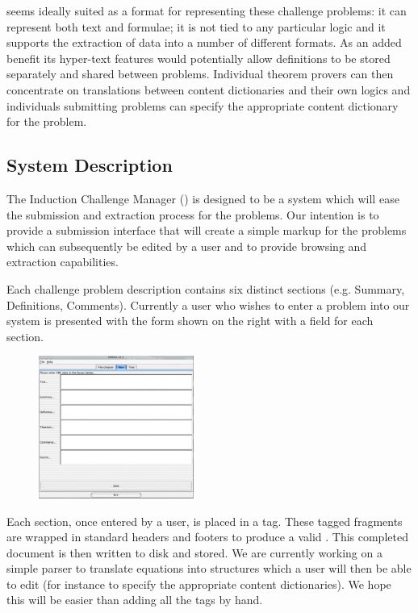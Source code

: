 {\omdoc} seems ideally suited as a format for representing these challenge
problems: it can represent both text and formulae; it
is not tied to any particular logic and it supports the extraction of data into a number
of different formats.  As an added benefit its hyper-text features would potentially allow
definitions to be stored separately and shared between problems.  Individual theorem
provers can then concentrate on translations between
{\openmath} content dictionaries and their own
logics and individuals submitting problems can specify the appropriate content dictionary
for the problem.

\subsection{System Description}
The Induction Challenge {\omdoc} Manager () is designed to be a system which
will ease the submission and extraction process for the problems.  Our intention is to
provide a submission interface that will create a simple {\omdoc} markup for the problems
which can subsequently be edited by a user and to provide browsing and extraction
capabilities.

Each challenge problem description contains six distinct sections (e.g. Summary,
Definitions, Comments).  Currently a user who wishes to enter a problem into our system is
presented with the form shown on the right with a field for each section.  

\begin{figure}
  \includegraphics[width=2in]{projects/induction-challenge/inputview}
\end{figure}
Each section, once entered by a user, is placed in a {} tag.  These tagged
fragments are wrapped in standard {\omdoc} headers and footers to produce a valid
{\omdoc}. This completed document is then written to disk and stored.  We are currently
working on a simple parser to translate equations into  structures which a
user will then be able to edit (for instance to specify the appropriate content
dictionaries).  We hope this will be easier than adding all the {\openmath} tags by hand.


